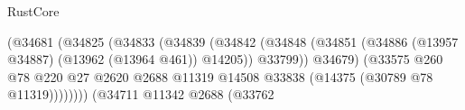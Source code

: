 \begin{lexlean}{RustCore}
\begin{coremodule}
                                                                  (@34681
                                                                    (@34825
                                                                      (@34833
                                                                        (@34839
                                                                          (@34842
                                                                            (@34848
                                                                              (@34851
                                                                                (@34886
                                                                                  (@13957 @34887)
                                                                                  (@13962
                                                                                    (@13964 @461))
                                                                                  @14205))
                                                                              @33799))
                                                                          @34679)
                                                                        (@33575
                                                                          @260
                                                                          @78
                                                                          @220
                                                                          @27
                                                                          @2620
                                                                          @2688
                                                                          @11319
                                                                          @14508
                                                                          @33838
                                                                          (@14375
                                                                            (@30789
                                                                              @78
                                                                              @11319))))))))
                                                              (@34711
                                                                @11342
                                                                @2688
                                                                (@33762

\end{coremodule}
\end{lexlean}
